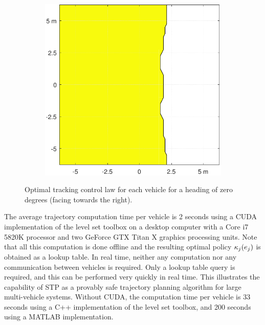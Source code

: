 \begin{figure}[!htb]
\begin{subfigure}{0.5\textwidth}
    \includegraphics[width=\columnwidth]{figs/Vcontrol}
    \label{fig:Vcontrol}
  \end{subfigure}%
  
  \caption{Optimal tracking control law for each vehicle for a heading of zero degrees (facing towards the right).}
  \label{fig:reactivity}
\end{figure}

The average trajectory computation time per vehicle is 2 seconds using a CUDA implementation of the level set toolbox on a desktop computer with a Core i7 5820K processor and two GeForce GTX Titan X graphics processing units. Note that all this computation is done offline and the resulting optimal policy $\kappa_j(e_j)$ is obtained as a lookup table. In real time, neither any computation nor any communication between vehicles is required. Only a lookup table query is required, and this can be performed very quickly in real time. This illustrates the capability of STP as a provably safe trajectory planning algorithm for large multi-vehicle systems. Without CUDA, the computation time per vehicle is 33 seconds using a C++ implementation of the level set toolbox, and 200 seconds using a MATLAB implementation.